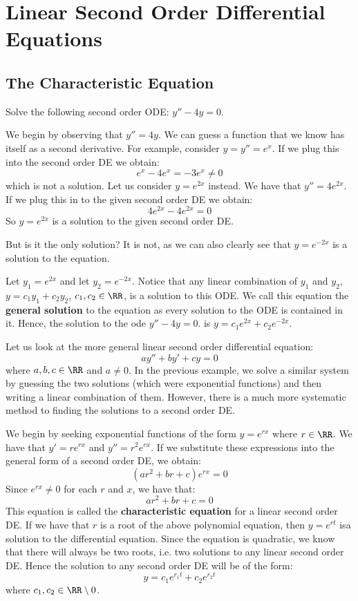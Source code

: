 \section{Linear Second Order Differential Equations}

\subsection{The Characteristic Equation}

\begin{example}
   Solve the following second order ODE: $ y'' - 4y = 0 $.
\end{example}
\begin{solution}
  We begin by observing that $y'' = 4y$. We can guess a function that we know has itself as a second derivative. For example, consider $y = y'' = e^x$. If we plug this into the second order DE we obtain:
   \[e^x - 4e^x = -3e^x \neq 0\]
   which is not a solution. Let us consider $y = e^{2x}$ instead. We have that $y'' = 4e^{2x}$. If we plug this in to the given second order DE we obtain:
   \[4e^{2x} - 4e^{2x} = 0 \]
   So $y = e^{2x}$ is a solution to the given second order DE.

   But is it the only solution? It is not, as we can also clearly see that $y = e^{-2x}$ is a solution to the equation. 

   Let $y_1 = e^{2x}$ and let $y_2 = e^{-2x}$. Notice that any linear combination of $y_1$ and $y_2$, $y = c_1y_1 + c_2y_2$, $c_1, c_2 \in \RR$, is a solution to this ODE. We call this equation the \textbf{general solution} to the equation as every solution to the ODE is contained in it. Hence, the solution to the ode $y'' - 4y = 0$. is $y = c_1e^{2x} + c_2e^{-2x}$.
\end{solution}

Let us look at the more general linear second order differential equation:
\[ ay'' + by' + cy = 0 \]
where $a, b, c \in \RR$ and $a \neq 0$. In the previous example, we solve a similar system by guessing the two solutions (which were exponential functions) and then writing a linear combination of them. However, there is a much more systematic method to finding the solutions to a second order DE.

We begin by seeking exponential functions of the form $y = e^{rx}$ where $r \in \RR$. We have that $y' = re^{rx}$ and $y'' = r^2e^{rx}$. If we substitute these expressions into the general form of a second order DE, we obtain:
\[ (ar^2 + br + c)e^{rx} = 0 \]
Since $e^{rx} \neq 0$ for each $r$ and $x$, we have that:
\[ ar^2 + br + c = 0 \]
This equation is called the \textbf{characteristic equation} for a linear second order DE. If we have that $r$ is a root of the above polynomial equation, then $y = e^{rt}$ isa  solution to the differential equation. Since the equation is quadratic, we know that there will always be two roots, i.e. two solutions to any linear second order DE. Hence the solution to any second order DE will be of the form:
\[ y = c_1e^{r_1t} + c_2e^{r_2t} \]
where $c_1, c_2 \in \RR \setminus 0 $.

